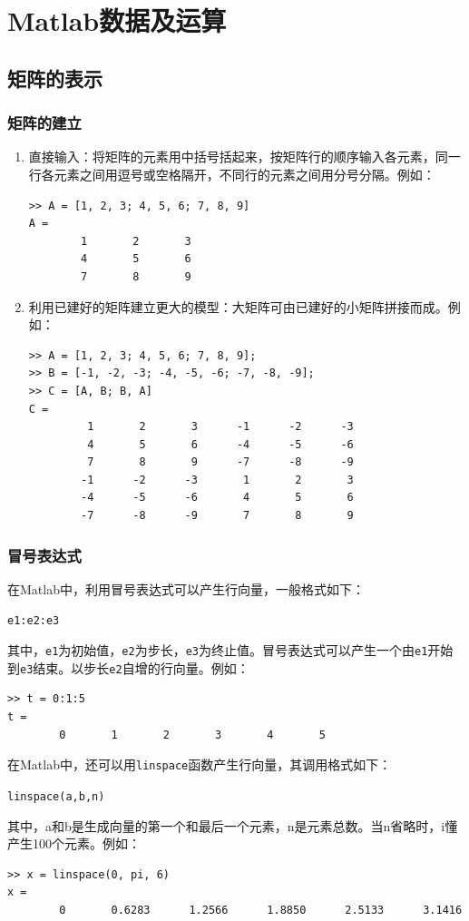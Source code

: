 \chapter{Matlab数据及运算}
\thispagestyle{empty}
\section{矩阵的表示}
\subsection{矩阵的建立}
\begin{enumerate}
	\item 直接输入：将矩阵的元素用中括号括起来，按矩阵行的顺序输入各元素，同一行各元素之间用逗号或空格隔开，不同行的元素之间用分号分隔。例如：
	\begin{lstlisting}
>> A = [1, 2, 3; 4, 5, 6; 7, 8, 9]
A = 
		1		2		3
		4		5		6
		7		8		9
	\end{lstlisting}

	\item 利用已建好的矩阵建立更大的模型：大矩阵可由已建好的小矩阵拼接而成。例如：
	\begin{lstlisting}
>> A = [1, 2, 3; 4, 5, 6; 7, 8, 9];
>> B = [-1, -2, -3; -4, -5, -6; -7, -8, -9];
>> C = [A, B; B, A]
C = 
		 1		 2		 3		-1		-2		-3
		 4		 5		 6		-4		-5		-6
		 7		 8		 9		-7		-8		-9
		-1		-2		-3		 1		 2		 3
		-4		-5		-6		 4		 5		 6
		-7		-8		-9		 7		 8		 9
	\end{lstlisting}

\end{enumerate}

\subsection{冒号表达式}
	在Matlab中，利用冒号表达式可以产生行向量，一般格式如下：
	\begin{center}
		\lstinline|e1:e2:e3|
	\end{center}

	其中，\lstinline|e1|为初始值，\lstinline|e2|为步长，\lstinline|e3|为终止值。冒号表达式可以产生一个由\lstinline|e1|开始到\lstinline|e3|结束。以步长\lstinline|e2|自增的行向量。例如：
	\begin{lstlisting}
>> t = 0:1:5
t = 
		0		1		2		3		4		5
	\end{lstlisting}

在Matlab中，还可以用\lstinline|linspace|函数产生行向量，其调用格式如下：
\begin{center}
	\lstinline|linspace(a,b,n)|
\end{center}
其中，a和b是生成向量的第一个和最后一个元素，n是元素总数。当n省略时，i懂产生100个元素。例如：
\begin{lstlisting}
>> x = linspace(0, pi, 6)
x =
		0		0.6283		1.2566		1.8850		2.5133		3.1416
\end{lstlisting}

